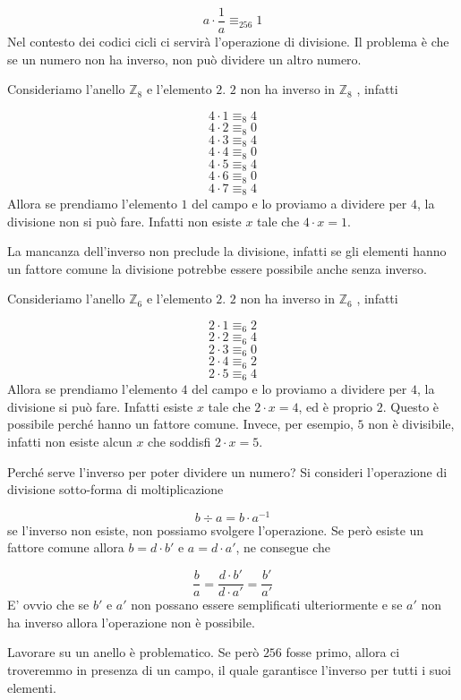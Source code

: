 \documentclass[12pt]{report}
\begin{document}
    $$a \cdot \frac{1}{a} \equiv_{256} 1$$
    Nel contesto dei codici cicli ci servirà l'operazione di divisione. Il problema è che se un numero non ha inverso, non può dividere un altro numero.

    \begin{exmp}
        Consideriamo l'anello $\mathbb{Z}_8$ e l'elemento $2$. $2$ non ha inverso in $\mathbb{Z}_8$ , infatti

        $$4 \cdot 1 \equiv_8 4$$
        $$4 \cdot 2 \equiv_8 0$$
        $$4 \cdot 3 \equiv_8 4$$
        $$4 \cdot 4 \equiv_8 0$$
        $$4 \cdot 5 \equiv_8 4$$
        $$4 \cdot 6 \equiv_8 0$$
        $$4 \cdot 7 \equiv_8 4$$
        Allora se prendiamo l'elemento $1$ del campo e lo proviamo a dividere per $4$, la divisione non si può fare. Infatti non esiste $x$ tale che $4 \cdot x = 1$.
    \end{exmp}
    La mancanza dell'inverso non preclude la divisione, infatti se gli elementi hanno un fattore comune la divisione potrebbe essere possibile anche senza inverso.

    \begin{exmp}
        Consideriamo l'anello $\mathbb{Z}_6$ e l'elemento $2$. $2$ non ha inverso in $\mathbb{Z}_6$ , infatti

        $$2 \cdot 1 \equiv_6 2$$
        $$2 \cdot 2 \equiv_6 4$$
        $$2 \cdot 3 \equiv_6 0$$
        $$2 \cdot 4 \equiv_6 2$$
        $$2 \cdot 5 \equiv_6 4$$
        Allora se prendiamo  l'elemento $4$ del campo e lo proviamo a dividere per $4$, la divisione si può fare. Infatti  esiste $x$ tale che $2 \cdot x = 4$, ed è proprio $2$. Questo è possibile perché hanno un fattore comune. Invece, per esempio, $5$ non è divisibile, infatti non esiste alcun $x$ che soddisfi $2 \cdot x = 5$.
    \end{exmp}

    \noindent
    Perché serve l'inverso per poter dividere un numero? Si consideri l'operazione di divisione sotto-forma di moltiplicazione

    $$b \div a  = b \cdot a^{-1}$$
    se l'inverso non esiste, non possiamo svolgere l'operazione. Se però esiste un fattore comune allora $b = d \cdot b'$ e $a = d \cdot a'$, ne consegue che

    $$\frac{b}{a} = \frac{d \cdot b'}{d \cdot a'} = \frac{b'}{a'}$$
    E' ovvio che se $b'$ e $a'$ non possano essere semplificati ulteriormente e se $a'$ non ha inverso allora l'operazione non è possibile.

    \noindent
    Lavorare su un anello è problematico. Se però $256$ fosse primo, allora ci troveremmo in presenza di un campo, il quale garantisce l'inverso per tutti i suoi elementi.
\end{document}

